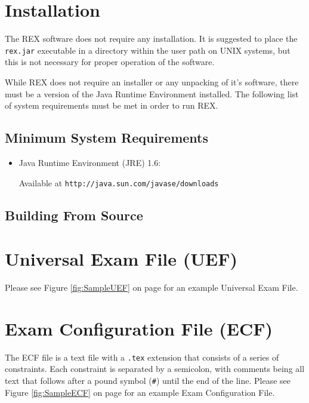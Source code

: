 \documentclass{article}
\begin{document}

\section{Installation}
The REX software does not require any installation. It is suggested to
place the \texttt{rex.jar} executable in a directory within the user
path on UNIX systems, but this is not necessary for proper operation
of the software.

While REX does not require an installer or any unpacking of it's software,
there must be a version of the Java Runtime Environment installed. The
following list of system requirements must be met in order to run REX.

\subsection{Minimum System Requirements}
\begin{itemize}
\item Java Runtime Environment (JRE) 1.6: 

Available at 
\verb|http://java.sun.com/javase/downloads|
\end{itemize}

\subsection{Building From Source}



\section{Universal Exam File (UEF)}

Please see Figure \ref{fig:SampleUEF} on page \pageref{fig:SampleUEF} for 
an example Universal Exam File.

\section{Exam Configuration File (ECF)}
The ECF file is a text file with a \texttt{.tex} extension that consists
of a series of constraints. Each constraint is separated by a semicolon,
with comments being all text that follows after a pound symbol 
(\texttt{\#}) until the end of the line. Please see Figure \ref{fig:SampleECF} 
on page \pageref{fig:SampleECF} for an example Exam Configuration File.
\end{document}
